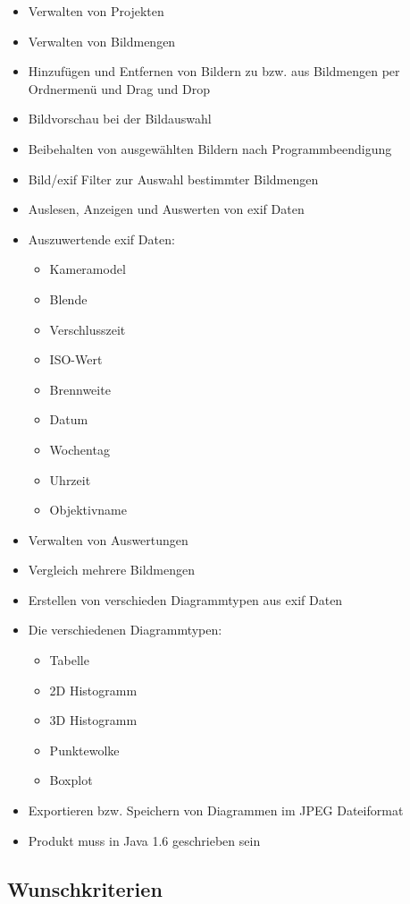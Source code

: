 \begin{itemize}
	\item Verwalten von Projekten
	\item Verwalten von Bildmengen
	\item Hinzufügen und Entfernen von Bildern zu bzw. aus Bildmengen per Ordnermenü und Drag und Drop
	\item Bildvorschau bei der Bildauswahl
	\item Beibehalten von ausgewählten Bildern nach Programmbeendigung
	\item Bild/\gls{exif} Filter zur Auswahl bestimmter Bildmengen
	\item Auslesen, Anzeigen und Auswerten von \gls{exif} Daten
	\item Auszuwertende \gls{exif} Daten:
	\label{subsec:auszuwertendedaten}
			\begin{itemize}
			\item Kameramodel
			\item Blende 
			\item Verschlusszeit
			\item ISO-Wert
			\item Brennweite
			\item Datum
			\item Wochentag
			\item Uhrzeit
			\item Objektivname
		\end{itemize}
	\item Verwalten von Auswertungen
	\item Vergleich mehrere Bildmengen
	\item Erstellen von verschieden Diagrammtypen aus \gls{exif} Daten
	\item Die verschiedenen Diagrammtypen:
		\begin{itemize}
		  \item Tabelle
			\item 2D Histogramm
			\item 3D Histogramm
			\item Punktewolke
			\item Boxplot
		\end{itemize}
	\item Exportieren bzw. Speichern von Diagrammen im JPEG Dateiformat
	\item Produkt muss in Java 1.6 geschrieben sein	
\end{itemize}

\subsection{Wunschkriterien} 
